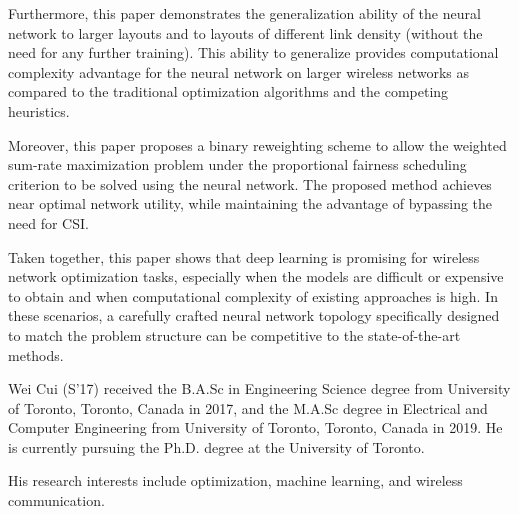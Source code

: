 \documentclass[journal,12pt,onecolumn,draftclsnofoot,]{IEEEtran}
\begin{document}
Furthermore, this paper demonstrates the generalization ability of the neural
network to larger layouts and to layouts of different link density (without the
need for any further training).  This ability to generalize provides
computational complexity advantage for the neural network on larger wireless
networks as compared to the traditional optimization algorithms and the
competing heuristics.

Moreover, this paper proposes a binary reweighting scheme to allow the weighted
sum-rate maximization problem under the proportional fairness scheduling
criterion to be solved using the neural network. The proposed method achieves
near optimal network utility, while maintaining the advantage of bypassing the
need for CSI.

Taken together, this paper shows that deep learning is promising for wireless
network optimization tasks, especially when the models are difficult or
expensive to obtain and when computational complexity of existing approaches 
is high. In these scenarios, a carefully crafted neural network topology
specifically designed to match the problem structure can be competitive to the
state-of-the-art methods.




\begin{IEEEbiography}
{Wei Cui}
(S'17) received the B.A.Sc in Engineering Science degree from University of Toronto, Toronto, Canada in 2017, and the M.A.Sc degree in Electrical and Computer Engineering from University of Toronto, Toronto, Canada in 2019. He is currently pursuing the Ph.D. degree at the University of Toronto.

His research interests include optimization, machine learning, and wireless communication.
\end{IEEEbiography}
\end{document}
